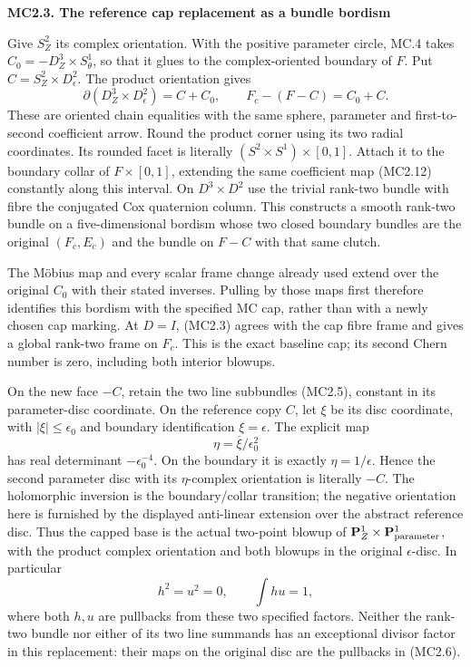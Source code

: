 \par

\medskip\noindent\textbf{MC2.3. The reference cap replacement as a bundle bordism}

\par\nobreak

Give \(S^2_Z\) its complex orientation. With the positive parameter
circle, MC.4 takes \(C_0=-D^3_Z\times S^1_\theta\), so that it glues
to the complex-oriented boundary of \(F\). Put
\(C=S^2_Z\times D^2_\epsilon\). The product orientation gives
\[
 \partial(D^3_Z\times D^2_\epsilon)=C+C_0,\qquad
 F_c-(F-C)=C_0+C.                                      \tag{MC2.14}
\]
These are oriented chain equalities with the same sphere, parameter
and first-to-second coefficient arrow. Round the product corner
using its two radial coordinates. Its rounded facet is literally
\((S^2\times S^1)\times[0,1]\). Attach it to the boundary collar of
\(F\times[0,1]\), extending the same coefficient map (MC2.12)
constantly along this interval. On \(D^3\times D^2\) use the trivial
rank-two bundle with fibre the conjugated Cox quaternion column.
This constructs a smooth rank-two bundle on a five-dimensional
bordism whose two closed boundary bundles are the original
\((F_c,E_c)\) and the bundle on \(F-C\) with that same clutch.

The Möbius map and every scalar frame change already used extend
over the original \(C_0\) with their stated inverses. Pulling by
those maps first therefore identifies this bordism with the
specified MC cap, rather than with a newly chosen cap marking.
At \(D=I\), (MC2.3) agrees with the cap fibre frame and gives a
global rank-two frame on \(F_c\). This is the exact baseline cap;
its second Chern number is zero, including both interior blowups.

On the new face \(-C\), retain the two line subbundles (MC2.5),
constant in its parameter-disc coordinate. On the reference copy
\(C\), let \(\xi\) be its disc coordinate, with
\(|\xi|\le\epsilon_0\) and boundary identification \(\xi=\epsilon\).
The explicit map
\[
              \eta=\overline\xi/\epsilon_0^2
                                                               \tag{MC2.14a}
\]
has real determinant \(-\epsilon_0^{-4}\). On the boundary it is
exactly \(\eta=1/\epsilon\). Hence the second parameter disc with
its \(\eta\)-complex orientation is literally \(-C\). The holomorphic
inversion is the boundary/collar transition; the negative orientation
here is furnished by the displayed anti-linear extension over the
abstract reference disc. Thus the capped base
is the actual two-point blowup of
\(\mathbf P^1_Z\times\mathbf P^1_{\rm parameter}\), with the
product complex orientation and both blowups in the original
\(\epsilon\)-disc. In particular
\[
 h^2=u^2=0,\qquad \int hu=1,                            \tag{MC2.15}
\]
where both \(h,u\) are pullbacks from these two specified factors.
Neither the rank-two bundle nor either of its two line summands
has an exceptional divisor factor in this replacement: their
maps on the original disc are the pullbacks in (MC2.6).


